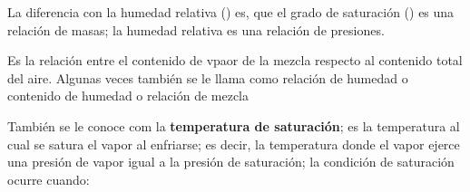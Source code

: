 \begin{description}
        La diferencia con la humedad relativa (\relativeHumidity) es, que el grado de saturación (\degreeOfSaturation[]{}) es una relación de masas; la humedad relativa es una relación de presiones.
        \item[Humedad específica:] Es la relación  entre el contenido de vpaor de la mezcla respecto al contenido total del aire. Algunas veces también se le llama como relación de humedad o contenido de humedad o relación de mezcla
        \item[Punto de rocío:] También se le conoce com la \textbf{temperatura de saturación}; es la temperatura al cual se satura el vapor al enfriarse; es decir, la temperatura donde el vapor ejerce una presión de vapor igual a la presión de saturación; la condición de saturación ocurre cuando:

    \end{description}


